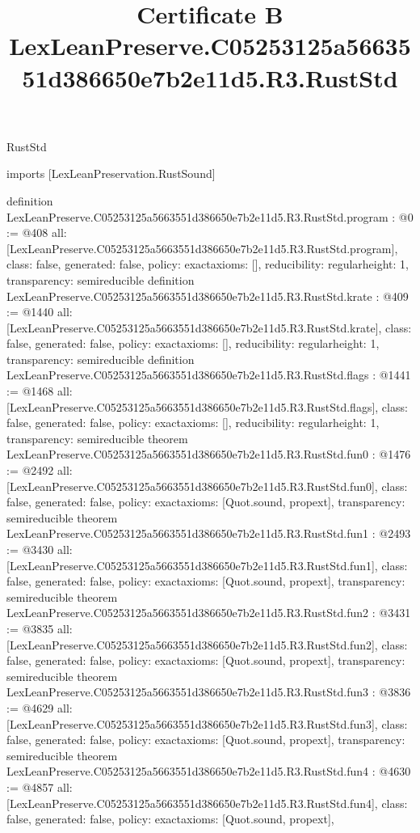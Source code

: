 \begin{lexlean}{RustStd}
\title{Certificate B LexLeanPreserve.C05253125a5663551d386650e7b2e11d5.R3.RustStd}
\begin{coremodule}
imports [LexLeanPreservation.RustSound]

definition LexLeanPreserve.C05253125a5663551d386650e7b2e11d5.R3.RustStd.program : @0 := @408 {
  all: [LexLeanPreserve.C05253125a5663551d386650e7b2e11d5.R3.RustStd.program],
  class: false,
  generated: false,
  policy: exact{axioms: []},
  reducibility: regular{height: 1},
  transparency: semireducible
}
definition LexLeanPreserve.C05253125a5663551d386650e7b2e11d5.R3.RustStd.krate : @409 := @1440 {
  all: [LexLeanPreserve.C05253125a5663551d386650e7b2e11d5.R3.RustStd.krate],
  class: false,
  generated: false,
  policy: exact{axioms: []},
  reducibility: regular{height: 1},
  transparency: semireducible
}
definition LexLeanPreserve.C05253125a5663551d386650e7b2e11d5.R3.RustStd.flags : @1441 := @1468 {
  all: [LexLeanPreserve.C05253125a5663551d386650e7b2e11d5.R3.RustStd.flags],
  class: false,
  generated: false,
  policy: exact{axioms: []},
  reducibility: regular{height: 1},
  transparency: semireducible
}
theorem LexLeanPreserve.C05253125a5663551d386650e7b2e11d5.R3.RustStd.fun0 : @1476 := @2492 {
  all: [LexLeanPreserve.C05253125a5663551d386650e7b2e11d5.R3.RustStd.fun0],
  class: false,
  generated: false,
  policy: exact{axioms: [Quot.sound, propext]},
  transparency: semireducible
}
theorem LexLeanPreserve.C05253125a5663551d386650e7b2e11d5.R3.RustStd.fun1 : @2493 := @3430 {
  all: [LexLeanPreserve.C05253125a5663551d386650e7b2e11d5.R3.RustStd.fun1],
  class: false,
  generated: false,
  policy: exact{axioms: [Quot.sound, propext]},
  transparency: semireducible
}
theorem LexLeanPreserve.C05253125a5663551d386650e7b2e11d5.R3.RustStd.fun2 : @3431 := @3835 {
  all: [LexLeanPreserve.C05253125a5663551d386650e7b2e11d5.R3.RustStd.fun2],
  class: false,
  generated: false,
  policy: exact{axioms: [Quot.sound, propext]},
  transparency: semireducible
}
theorem LexLeanPreserve.C05253125a5663551d386650e7b2e11d5.R3.RustStd.fun3 : @3836 := @4629 {
  all: [LexLeanPreserve.C05253125a5663551d386650e7b2e11d5.R3.RustStd.fun3],
  class: false,
  generated: false,
  policy: exact{axioms: [Quot.sound, propext]},
  transparency: semireducible
}
theorem LexLeanPreserve.C05253125a5663551d386650e7b2e11d5.R3.RustStd.fun4 : @4630 := @4857 {
  all: [LexLeanPreserve.C05253125a5663551d386650e7b2e11d5.R3.RustStd.fun4],
  class: false,
  generated: false,
  policy: exact{axioms: [Quot.sound, propext]},
}
\end{coremodule}
\end{lexlean}
